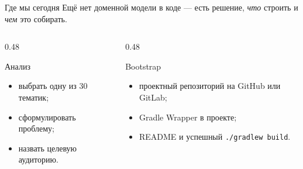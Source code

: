 \begin{frame}{Где мы сегодня}
   Ещё нет доменной модели в коде ---
  есть решение, \emph{что} строить и \emph{чем} это собирать.

  \medskip
  \begin{columns}[T]
    \begin{column}{0.48\textwidth}
      \begin{block}{Анализ}
        \begin{itemize}
          \item выбрать одну из 30 тематик;
          \item сформулировать проблему;
          \item назвать целевую аудиторию.
        \end{itemize}
      \end{block}
    \end{column}
    \begin{column}{0.48\textwidth}
      \begin{block}{Bootstrap}
        \begin{itemize}
          \item проектный репозиторий на GitHub или GitLab;
          \item Gradle Wrapper в проекте;
          \item README и успешный \texttt{./gradlew build}.
        \end{itemize}
      \end{block}
    \end{column}
  \end{columns}
\end{frame}
